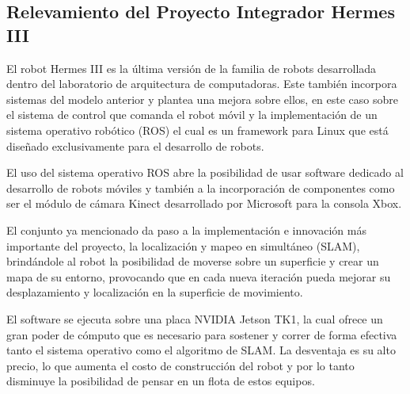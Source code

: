 \subsection{Relevamiento del Proyecto Integrador Hermes III}

El robot Hermes III es la última versión de la familia de robots desarrollada dentro del laboratorio de arquitectura de computadoras. Este también incorpora sistemas del modelo anterior y plantea una mejora sobre ellos, en este caso sobre el sistema de control que comanda el robot móvil y la implementación de un sistema operativo robótico (ROS) el cual es un framework para Linux que está diseñado exclusivamente para el desarrollo de robots. \cite{micolini2022hermes}

El uso del sistema operativo ROS abre la posibilidad de usar software dedicado al desarrollo de robots móviles y también a la incorporación de componentes como ser el módulo de cámara Kinect desarrollado por Microsoft para la consola Xbox.

El conjunto ya mencionado da paso a la implementación e innovación más importante del proyecto, la localización y mapeo en simultáneo (SLAM), brindándole al robot la posibilidad de moverse sobre un superficie y crear un mapa de su entorno, provocando que en cada nueva iteración pueda mejorar su desplazamiento y localización en la superficie de movimiento.

El software se ejecuta sobre una placa NVIDIA Jetson TK1, la cual ofrece un gran poder de cómputo que es necesario para sostener y correr de forma efectiva tanto el sistema operativo como el algoritmo de SLAM. La desventaja es su alto precio, lo que aumenta el costo de construcción del robot y por lo tanto disminuye la posibilidad de pensar en un flota de estos equipos.
